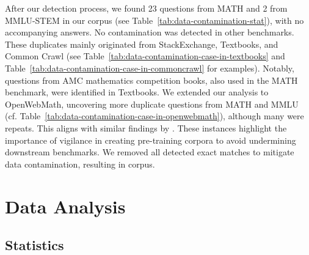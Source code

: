 After our detection process, we found 23 questions from MATH and 2 from MMLU-STEM in our corpus (see Table~\ref{tab:data-contamination-stat}), with no accompanying answers. No contamination was detected in other benchmarks. These duplicates mainly originated from StackExchange, Textbooks, and Common Crawl (see Table~\ref{tab:data-contamination-case-in-textbooks} and Table~\ref{tab:data-contamination-case-in-commoncrawl} for examples). Notably, questions from AMC mathematics competition books, also used in the MATH benchmark, were identified in Textbooks. We extended our analysis to OpenWebMath, uncovering more duplicate questions from MATH and MMLU (cf. Table~\ref{tab:data-contamination-case-in-openwebmath}), although many were repeats. This aligns with similar findings by \citet{DBLP:journals/corr/abs-2310-10631-proofpile-2}. These instances highlight the importance of vigilance in creating pre-training corpora to avoid undermining downstream benchmarks. We removed all detected exact matches to mitigate data contamination, resulting in \mathpile corpus.

\section{Data Analysis}

\subsection{Statistics}

